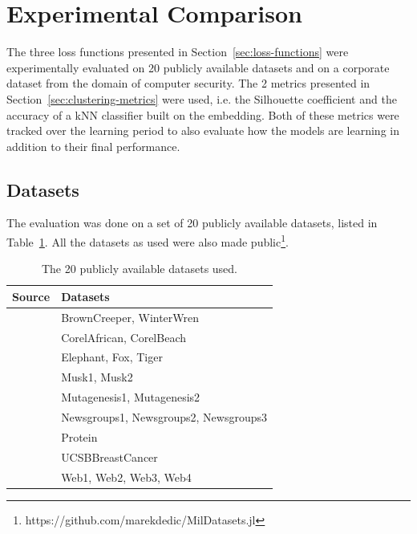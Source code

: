 \section{Experimental Comparison}\label{sec:experimental-comparison}

The three loss functions presented in Section~\ref{sec:loss-functions} were experimentally evaluated on 20 publicly available datasets and on a corporate dataset from the domain of computer security. The 2 metrics presented in Section~\ref{sec:clustering-metrics} were used, i.e. the Silhouette coefficient and the accuracy of a kNN classifier built on the embedding. Both of these metrics were tracked over the learning period to also evaluate how the models are learning in addition to their final performance.

\subsection{Datasets}

The evaluation was done on a set of 20 publicly available datasets, listed in Table~\ref{tab:datasets}. All the datasets as used were also made public\footnote{https://github.com/marekdedic/MilDatasets.jl}.

\begin{table}
  \centering
  \begin{tabular}{ll}
    \toprule
    Source & Datasets \\
    \midrule
    \cite{briggs_rank-loss_2012} & BrownCreeper, WinterWren \\
    \cite{chen_miles:_2006} & CorelAfrican, CorelBeach \\
    \cite{andrews_support_2002} & Elephant, Fox, Tiger \\
    \cite{dietterich_solving_1997} & Musk1, Musk2 \\
    \cite{srinivasan_comparing_1995} & Mutagenesis1, Mutagenesis2 \\
    \cite{zhou_multi-instance_2008} & Newsgroups1, Newsgroups2, Newsgroups3 \\
    \cite{ray_learning_2005, ray_supervised_2005} & Protein \\
    \cite{kandemir_empowering_2014} & UCSBBreastCancer \\
    \cite{zhou_multi-instance_2005} & Web1, Web2, Web3, Web4 \\
    \bottomrule
  \end{tabular}
  \caption{The 20 publicly available datasets used.}\label{tab:datasets}
\end{table}

